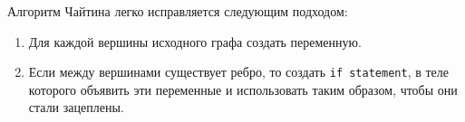 Алгоритм Чайтина легко исправляется следующим подходом:

\begin{enumerate} %
    \item Для каждой вершины исходного графа создать переменную.
    \item Если между вершинами существует ребро, то создать \texttt{if statement}, в теле
    которого объявить эти переменные и использовать таким образом, чтобы они стали зацеплены.
\end{enumerate}
